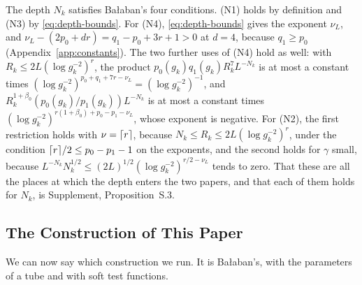 \documentclass[11pt]{preprint}
\DeclarePairedDelimiter{\ceil}{\lceil}{\rceil}
\numberwithin{equation}{section}
\theoremstyle{definition}
\theoremstyle{remark}
\theoremstyle{plain}
\begin{document}
The depth $N_k$ satisfies Ba{\l}aban's four conditions. (N1) holds by definition and (N3) by \eqref{eq:depth-bounds}. For (N4), \eqref{eq:depth-bounds} gives the exponent $\nu_L$, and $\nu_L - (2p_0 + dr) = q_1 - p_0 + 3r + 1 > 0$ at $d = 4$, because $q_1 \geq p_0$ (Appendix~\ref{app:constants}). The two further uses of (N4) hold as well: with $R_k \leq 2L(\log g_k^{-2})^r$, the product $p_0(g_k)q_1(g_k)R_k^7L^{-N_k}$ is at most a constant times $(\log g_k^{-2})^{p_0+q_1+7r-\nu_L} = (\log g_k^{-2})^{-1}$, and $R_k^{1+\beta_0}(p_0(g_k)/p_1(g_k))L^{-N_k}$ is at most a constant times $(\log g_k^{-2})^{r(1+\beta_0)+p_0-p_1-\nu_L}$, whose exponent is negative. For (N2), the first restriction holds with $\nu = \ceil{r}$, because $N_k \leq R_k \leq 2L(\log g_k^{-2})^r$, under the condition $\ceil{r}/2 \leq p_0 - p_1 - 1$ on the exponents, and the second holds for $\gamma$ small, because $L^{-N_k}N_k^{1/2} \leq (2L)^{1/2}(\log g_k^{-2})^{r/2-\nu_L}$ tends to zero. That these are all the places at which the depth enters the two papers, and that each of them holds for $N_k$, is Supplement, Proposition~S.3.

\subsection{The Construction of This Paper}\label{sec:the-construction}

We can now say which construction we run. It is Ba{\l}aban's, with the parameters of a tube and with soft test functions.
\end{document}
